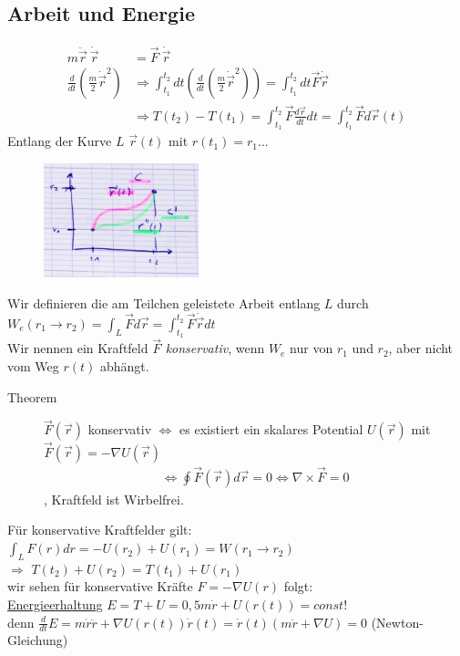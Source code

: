 \subsection{Arbeit und Energie}
\begin{align*}
  m\ddot{\vec{r}}\:\dot{\vec{r}}&= \vec{F}\:\dot{\vec{r}}\\
  \frac{d}{dt} \left( \frac{m}{2} \dot{\vec{r}}^2 \right)
  &\Rightarrow\int_{t_1}^{t_2}dt(\frac{d}{dt}(\frac{m}{2} \dot{\vec{r}}^2))
  = \int_{t_1}^{t_2}dt\vec{F}\dot{\vec{r}}\\
  &\Rightarrow T(t_2)-T(t_1) = \int_{t_1}^{t_2}\vec{F}\frac{d\vec{r}}{dt}dt
  = \int_{t_1}^{t_2}\vec{F}d\vec{r}(t)
\end{align*}
Entlang der Kurve $L$ $\vec{r}(t)$ mit $r(t_1)=r_1...$
\begin{figure}[h]
\begin{center}
\includegraphics[width=0.4\textwidth]{Skizzen/Anhang2.jpg}
\end{center}
\caption{}
\end{figure}
Wir definieren die am Teilchen geleistete Arbeit entlang $L$ durch $W_e(r_1\rightarrow r_2)=\int_L \vec{F}d\vec{r}=\int_{t_1}^{t_2}\vec{F}\dot{\vec{r}}dt$\\
Wir nennen ein Kraftfeld $\vec{F}$ \emph{konservativ}, wenn $W_e$ nur von $r_1$ und $r_2$, aber nicht vom Weg $r(t)$ abhängt.\\
\begin{description}
\item[Theorem] $\vec{F}(\vec{r})$ konservativ $\Leftrightarrow$ es existiert ein skalares Potential $U(\vec{r})$ mit $\vec{F}(\vec{r})=-\nabla U(\vec{r})$
\begin{align*}
\Leftrightarrow \oint\vec{F}(\vec{r})d\vec{r}=0 \Leftrightarrow\nabla \times\vec{F}=0
\end{align*}
, Kraftfeld ist Wirbelfrei.
\end{description}
Für konservative Kraftfelder gilt: $\int_L F(r)dr=-U(r_2)+U(r_1)=W(r_1\rightarrow r_2)$\\
$\Rightarrow$ $T(t_2)+U(r_2)=T(t_1)+U(r_1)$\\
wir sehen für konservative Kräfte $F=-\nabla U(r)$ folgt:\\
\underline{Energieerhaltung} $E=T+U=0,5m\dot{r}+U(r(t))=const$!\\
denn $\frac{d}{dt}E=m\dot{r}\ddot{r}+\nabla U(r(t))\dot{r}(t)=\dot{r}(t)(m\ddot{r}+\nabla U)=0$ (Newton-Gleichung)

